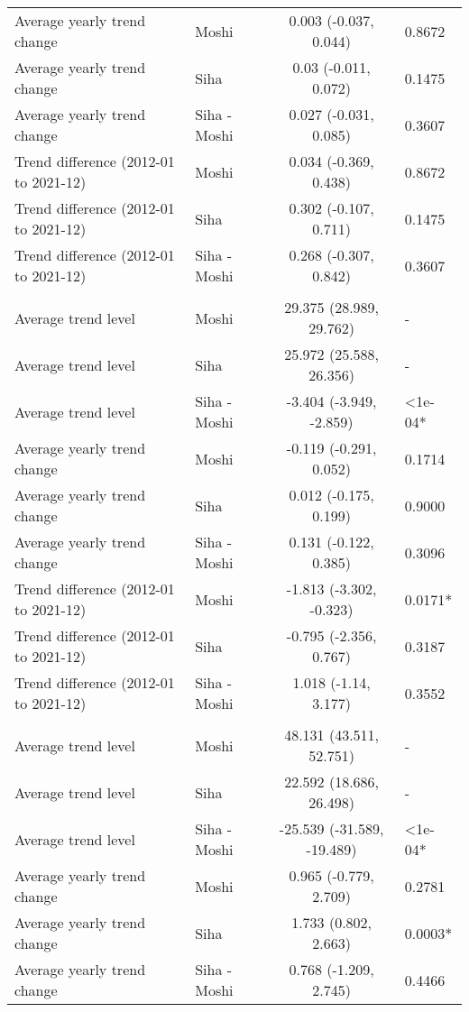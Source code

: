 \begin{longtable}{l|lcl}
Average yearly trend change & Moshi & 0.003 (-0.037, 0.044) & 0.8672 \\ 
Average yearly trend change & Siha & 0.03 (-0.011, 0.072) & 0.1475 \\ 
Average yearly trend change & Siha - Moshi & 0.027 (-0.031, 0.085) & 0.3607 \\ 
Trend difference (2012-01 to 2021-12) & Moshi & 0.034 (-0.369, 0.438) & 0.8672 \\ 
Trend difference (2012-01 to 2021-12) & Siha & 0.302 (-0.107, 0.711) & 0.1475 \\ 
Trend difference (2012-01 to 2021-12) & Siha - Moshi & 0.268 (-0.307, 0.842) & 0.3607 \\ 
\midrule\addlinespace[2.5pt]
\multicolumn{4}{l}{UTCI } \\[2.5pt] 
\midrule\addlinespace[2.5pt]
Average trend level & Moshi & 29.375 (28.989, 29.762) & - \\ 
Average trend level & Siha & 25.972 (25.588, 26.356) & - \\ 
Average trend level & Siha - Moshi & -3.404 (-3.949, -2.859) & <1e-04* \\ 
Average yearly trend change & Moshi & -0.119 (-0.291, 0.052) & 0.1714 \\ 
Average yearly trend change & Siha & 0.012 (-0.175, 0.199) & 0.9000 \\ 
Average yearly trend change & Siha - Moshi & 0.131 (-0.122, 0.385) & 0.3096 \\ 
Trend difference (2012-01 to 2021-12) & Moshi & -1.813 (-3.302, -0.323) & 0.0171* \\ 
Trend difference (2012-01 to 2021-12) & Siha & -0.795 (-2.356, 0.767) & 0.3187 \\ 
Trend difference (2012-01 to 2021-12) & Siha - Moshi & 1.018 (-1.14, 3.177) & 0.3552 \\ 
\midrule\addlinespace[2.5pt]
\multicolumn{4}{l}{Rainfall (mm)} \\[2.5pt] 
\midrule\addlinespace[2.5pt]
Average trend level & Moshi & 48.131 (43.511, 52.751) & - \\ 
Average trend level & Siha & 22.592 (18.686, 26.498) & - \\ 
Average trend level & Siha - Moshi & -25.539 (-31.589, -19.489) & <1e-04* \\ 
Average yearly trend change & Moshi & 0.965 (-0.779, 2.709) & 0.2781 \\ 
Average yearly trend change & Siha & 1.733 (0.802, 2.663) & 0.0003* \\ 
Average yearly trend change & Siha - Moshi & 0.768 (-1.209, 2.745) & 0.4466 \\ 

\end{longtable}
